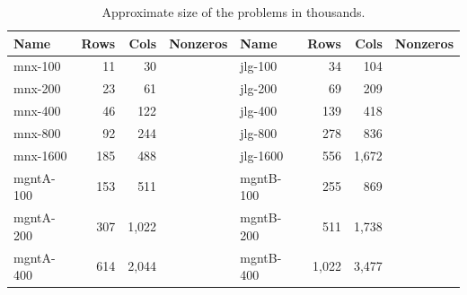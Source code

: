 \begin{table}[ht]
  \begin{center}
    \begin{tabular}{|l||r|r|r||l|r|r|r|} \hline
      Name      & Rows  &  Cols & Nonzeros 
    & Name      & Rows  &  Cols & Nonzeros \\ \hline\hline
      mnx-100   &    11 &    30 &   
    & jlg-100   &    34 &   104 & \\
      mnx-200   &    23 &    61 & 
    & jlg-200   &    69 &   209 & \\
      mnx-400   &    46 &   122 & 
    & jlg-400   &   139 &   418 & \\
      mnx-800   &    92 &   244 & 
    & jlg-800   &   278 &   836 & \\
      mnx-1600  &   185 &   488 & 
    & jlg-1600  &   556 & 1,672 & \\ \hline
      mgntA-100 &   153 &   511 & 
    & mgntB-100 &   255 &   869 & \\
      mgntA-200 &   307 & 1,022 & 
    & mgntB-200 &   511 & 1,738 & \\
      mgntA-400 &   614 & 2,044 & 
    & mgntB-400 & 1,022 & 3,477 & \\ \hline
    \end{tabular}
    \caption{Approximate size of the problems in thousands.}
    \label{table:ProblemSizes}
  \end{center} \vspace{-3ex}
\end{table}

